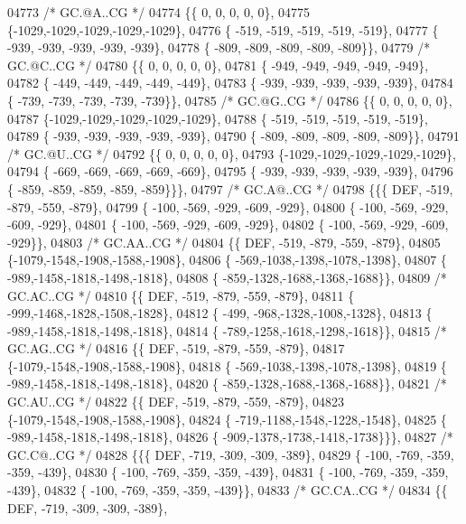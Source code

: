 \begin{DoxyCode}
04773 \textcolor{comment}{/* GC.@A..CG */}
04774 \{\{    0,    0,    0,    0,    0\},
04775 \{-1029,-1029,-1029,-1029,-1029\},
04776 \{ -519, -519, -519, -519, -519\},
04777 \{ -939, -939, -939, -939, -939\},
04778 \{ -809, -809, -809, -809, -809\}\},
04779 \textcolor{comment}{/* GC.@C..CG */}
04780 \{\{    0,    0,    0,    0,    0\},
04781 \{ -949, -949, -949, -949, -949\},
04782 \{ -449, -449, -449, -449, -449\},
04783 \{ -939, -939, -939, -939, -939\},
04784 \{ -739, -739, -739, -739, -739\}\},
04785 \textcolor{comment}{/* GC.@G..CG */}
04786 \{\{    0,    0,    0,    0,    0\},
04787 \{-1029,-1029,-1029,-1029,-1029\},
04788 \{ -519, -519, -519, -519, -519\},
04789 \{ -939, -939, -939, -939, -939\},
04790 \{ -809, -809, -809, -809, -809\}\},
04791 \textcolor{comment}{/* GC.@U..CG */}
04792 \{\{    0,    0,    0,    0,    0\},
04793 \{-1029,-1029,-1029,-1029,-1029\},
04794 \{ -669, -669, -669, -669, -669\},
04795 \{ -939, -939, -939, -939, -939\},
04796 \{ -859, -859, -859, -859, -859\}\}\},
04797 \textcolor{comment}{/* GC.A@..CG */}
04798 \{\{\{  DEF, -519, -879, -559, -879\},
04799 \{ -100, -569, -929, -609, -929\},
04800 \{ -100, -569, -929, -609, -929\},
04801 \{ -100, -569, -929, -609, -929\},
04802 \{ -100, -569, -929, -609, -929\}\},
04803 \textcolor{comment}{/* GC.AA..CG */}
04804 \{\{  DEF, -519, -879, -559, -879\},
04805 \{-1079,-1548,-1908,-1588,-1908\},
04806 \{ -569,-1038,-1398,-1078,-1398\},
04807 \{ -989,-1458,-1818,-1498,-1818\},
04808 \{ -859,-1328,-1688,-1368,-1688\}\},
04809 \textcolor{comment}{/* GC.AC..CG */}
04810 \{\{  DEF, -519, -879, -559, -879\},
04811 \{ -999,-1468,-1828,-1508,-1828\},
04812 \{ -499, -968,-1328,-1008,-1328\},
04813 \{ -989,-1458,-1818,-1498,-1818\},
04814 \{ -789,-1258,-1618,-1298,-1618\}\},
04815 \textcolor{comment}{/* GC.AG..CG */}
04816 \{\{  DEF, -519, -879, -559, -879\},
04817 \{-1079,-1548,-1908,-1588,-1908\},
04818 \{ -569,-1038,-1398,-1078,-1398\},
04819 \{ -989,-1458,-1818,-1498,-1818\},
04820 \{ -859,-1328,-1688,-1368,-1688\}\},
04821 \textcolor{comment}{/* GC.AU..CG */}
04822 \{\{  DEF, -519, -879, -559, -879\},
04823 \{-1079,-1548,-1908,-1588,-1908\},
04824 \{ -719,-1188,-1548,-1228,-1548\},
04825 \{ -989,-1458,-1818,-1498,-1818\},
04826 \{ -909,-1378,-1738,-1418,-1738\}\}\},
04827 \textcolor{comment}{/* GC.C@..CG */}
04828 \{\{\{  DEF, -719, -309, -309, -389\},
04829 \{ -100, -769, -359, -359, -439\},
04830 \{ -100, -769, -359, -359, -439\},
04831 \{ -100, -769, -359, -359, -439\},
04832 \{ -100, -769, -359, -359, -439\}\},
04833 \textcolor{comment}{/* GC.CA..CG */}
04834 \{\{  DEF, -719, -309, -309, -389\},

\end{DoxyCode}

